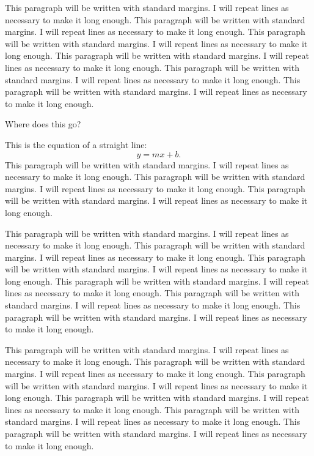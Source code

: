 \documentclass[numbib]{buthesis}  %
\begin{document}
This paragraph will be written with standard margins. I will repeat
lines as necessary to make it long enough. This paragraph will be
written with standard margins. I will repeat lines as necessary to
make it long enough. This paragraph will be written with standard
margins. I will repeat lines as necessary to make it long enough. This
paragraph will be written with standard margins. I will repeat lines
as necessary to make it long enough. This paragraph will be written
with standard margins. I will repeat lines as necessary to make it
long enough. This paragraph will be written with standard margins. I
will repeat lines as necessary to make it long enough.

Where does this go?

This is the equation of a straight line:
\begin{equation}
y = mx + b.
\end{equation}
This paragraph will be written with standard margins. I will repeat
lines as necessary to make it long enough. This paragraph will be
written with standard margins. I will repeat lines as necessary to
make it long enough. This paragraph will be written with standard
margins. I will repeat lines as necessary to make it long enough.


This paragraph will be written with standard margins. I will repeat
lines as necessary to make it long enough. This paragraph will be
written with standard margins. I will repeat lines as necessary to
make it long enough. This paragraph will be written with standard
margins. I will repeat lines as necessary to make it long enough.
This paragraph will be written with standard margins. I will repeat
lines as necessary to make it long enough. This paragraph will be
written with standard margins. I will repeat lines as necessary to
make it long enough. This paragraph will be written with standard
margins. I will repeat lines as necessary to make it long enough.


This paragraph will be written with standard margins. I will repeat
lines as necessary to make it long enough. This paragraph will be
written with standard margins. I will repeat lines as necessary to
make it long enough. This paragraph will be written with standard
margins. I will repeat lines as necessary to make it long enough. This
paragraph will be written with standard margins. I will repeat lines
as necessary to make it long enough. This paragraph will be written
with standard margins. I will repeat lines as necessary to make it
long enough. This paragraph will be written with standard margins. I
will repeat lines as necessary to make it long enough.
\end{document}

